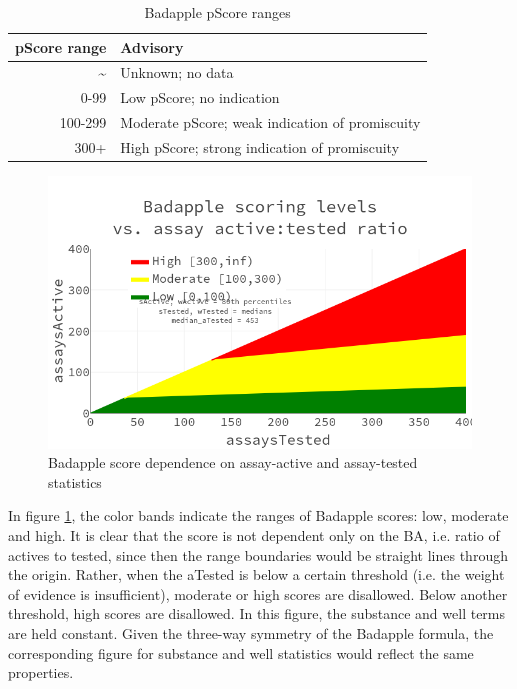 \begin{table}
\caption{Badapple pScore ranges}
\begin{center}
\begin{tabular}{r|l} 
\hline
\textbf{pScore range} & \textbf{Advisory} \\
\hline
\~{} & Unknown; no data \\
0-99 & Low pScore; no indication \\
100-299 & Moderate pScore; weak indication of promiscuity \\
300+ & High pScore; strong indication of promiscuity \\
\hline
\end{tabular}
\end{center}
\label{table:ba_ranges}
\end{table}

\begin{figure}
	\includegraphics[width=\textwidth]{figures/badapple/badapple_formula.png}
	\caption{Badapple score dependence on assay-active and assay-tested statistics}
	\label{fig:BA_01}
\end{figure}

In figure \ref{fig:BA_01}, the color bands indicate the ranges of Badapple scores: low, moderate and high. It is clear that the score is not dependent only on the BA, i.e. ratio of actives to tested, since then the range boundaries would be straight lines through the origin. Rather, when the aTested is below a certain threshold (i.e. the weight of evidence is insufficient), moderate or high scores are disallowed. Below another threshold, high scores are disallowed. In this figure, the substance and well terms are held constant. Given the three-way symmetry of the Badapple formula, the corresponding figure for substance and well statistics would reflect the same properties.

